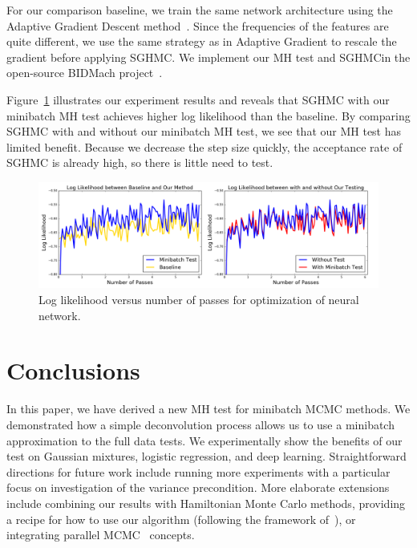 \documentclass{article}
\begin{document}
For our comparison baseline, we train the same network architecture using the Adaptive Gradient
Descent method~\cite{adapGrad}. Since the frequencies of the features are quite different, we use
the same strategy as in Adaptive Gradient to rescale the gradient before applying SGHMC. We
implement our MH test and SGHMCin the open-source BIDMach project~\cite{canny2013bidmach}.  

Figure~\ref{fig:nnet_fig} illustrates our experiment results and reveals that SGHMC with our
minibatch MH test achieves higher log likelihood than the baseline. By comparing SGHMC with and
without our minibatch MH test, we see that our MH test has limited benefit. Because we decrease the
step size quickly, the acceptance rate of SGHMC is already high, so there is little need to test.

\begin{figure}[t]
    \centering
    \includegraphics[width=1\linewidth]{exp3}
    \caption{Log likelihood versus number of passes for optimization of neural network.}
    \label{fig:nnet_fig}
    \vspace{-10pt}
\end{figure}

\fi


\section{Conclusions}\label{sec:conclusion}

In this paper, we have derived a new MH test for minibatch MCMC methods. We demonstrated how a
simple deconvolution process allows us to use a minibatch approximation to the full data tests. We
experimentally show the benefits of our test on Gaussian mixtures, logistic regression, and deep
learning.  Straightforward directions for future work include running more experiments with a
particular focus on investigation of the variance precondition.  More elaborate extensions include
combining our results with Hamiltonian Monte Carlo methods, providing a recipe for how to use our
algorithm (following the framework of~\cite{sgmcmc_2015}), or integrating parallel
MCMC~\cite{conf/uai/AngelinoKWSA14,conf/icml/AhnSW14} concepts.
\end{document}
